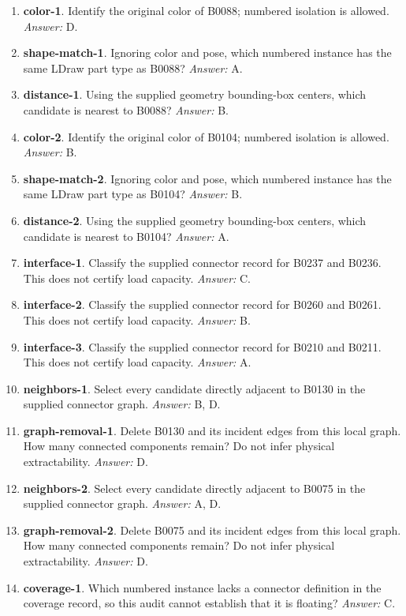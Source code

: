 \begin{enumerate}
\item \textbf{color-1}. Identify the original color of B0088; numbered isolation is allowed. \textit{Answer:} D.
\item \textbf{shape-match-1}. Ignoring color and pose, which numbered instance has the same LDraw part type as B0088? \textit{Answer:} A.
\item \textbf{distance-1}. Using the supplied geometry bounding-box centers, which candidate is nearest to B0088? \textit{Answer:} B.
\item \textbf{color-2}. Identify the original color of B0104; numbered isolation is allowed. \textit{Answer:} B.
\item \textbf{shape-match-2}. Ignoring color and pose, which numbered instance has the same LDraw part type as B0104? \textit{Answer:} B.
\item \textbf{distance-2}. Using the supplied geometry bounding-box centers, which candidate is nearest to B0104? \textit{Answer:} A.
\item \textbf{interface-1}. Classify the supplied connector record for B0237 and B0236. This does not certify load capacity. \textit{Answer:} C.
\item \textbf{interface-2}. Classify the supplied connector record for B0260 and B0261. This does not certify load capacity. \textit{Answer:} B.
\item \textbf{interface-3}. Classify the supplied connector record for B0210 and B0211. This does not certify load capacity. \textit{Answer:} A.
\item \textbf{neighbors-1}. Select every candidate directly adjacent to B0130 in the supplied connector graph. \textit{Answer:} B, D.
\item \textbf{graph-removal-1}. Delete B0130 and its incident edges from this local graph. How many connected components remain? Do not infer physical extractability. \textit{Answer:} D.
\item \textbf{neighbors-2}. Select every candidate directly adjacent to B0075 in the supplied connector graph. \textit{Answer:} A, D.
\item \textbf{graph-removal-2}. Delete B0075 and its incident edges from this local graph. How many connected components remain? Do not infer physical extractability. \textit{Answer:} D.
\item \textbf{coverage-1}. Which numbered instance lacks a connector definition in the coverage record, so this audit cannot establish that it is floating? \textit{Answer:} C.

\end{enumerate}
